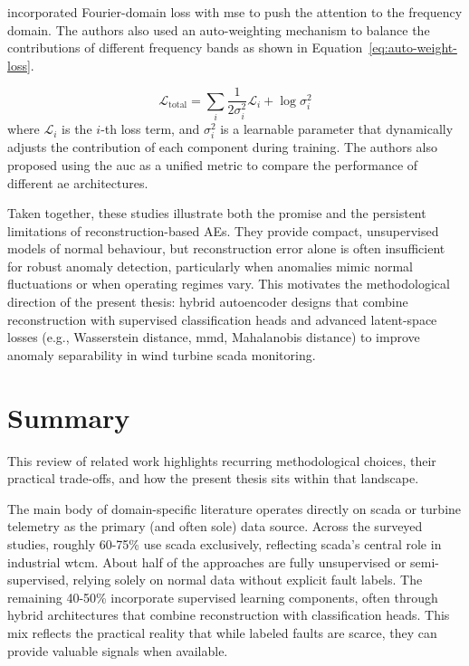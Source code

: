 \cite{yao_svd-ae_2024} incorporated Fourier-domain loss with \gls{mse} to push the attention to the frequency domain.
The authors also used an auto-weighting mechanism to balance the contributions of different frequency bands as shown in Equation~\ref{eq:auto-weight-loss}.

\begin{equation}
\label{eq:auto-weight-loss}
\mathcal{L}_{\text{total}} = \sum_{i} \frac{1}{2\sigma_i^2} \mathcal{L}_i + \log \sigma_i^2
\end{equation}
where $\mathcal{L}_i$ is the $i$-th loss term, and $\sigma_i^2$ is a learnable parameter that dynamically adjusts the contribution of each component during training.
The authors also proposed using the \gls{auc} as a unified metric to compare the performance of different \gls{ae} architectures.

Taken together, these studies illustrate both the promise and the persistent limitations of reconstruction-based AEs.
They provide compact, unsupervised models of normal behaviour, but reconstruction error alone is often insufficient for robust anomaly detection, particularly when anomalies mimic normal fluctuations or when operating regimes vary.
This motivates the methodological direction of the present thesis: hybrid autoencoder designs that combine reconstruction with supervised classification heads and advanced latent-space losses (e.g., Wasserstein distance, \gls{mmd}, Mahalanobis distance) to improve anomaly separability in wind turbine \gls{scada} monitoring.

\section{Summary}
\label{sec:related-works-summary}
This review of related work highlights recurring methodological choices, their practical trade-offs, and how the present thesis sits within that landscape.

The main body of domain-specific literature operates directly on \gls{scada} or turbine telemetry as the primary (and often sole) data source.
Across the surveyed studies, roughly 60-75\% use \gls{scada} exclusively, reflecting \gls{scada}'s central role in industrial \gls{wtcm}.
About half of the approaches are fully unsupervised or semi-supervised, relying solely on normal data without explicit fault labels. 
The remaining 40-50\% incorporate supervised learning components, often through hybrid architectures that combine reconstruction with classification heads. 
This mix reflects the practical reality that while labeled faults are scarce, they can provide valuable signals when available.

